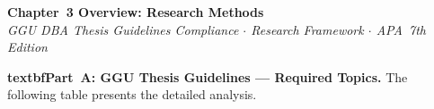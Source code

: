 
\thispagestyle{plain}

\begin{center}
{\large\bfseries\color{ggunavy} Chapter~3 Overview: Research Methods}\\[0.2cm]
{\small\textit{GGU DBA Thesis Guidelines Compliance $\cdot$ Research Framework $\cdot$ APA~7th Edition}}
\end{center}

\vspace{0.3cm}

\noindent\textbf{textbfPart~A: GGU Thesis Guidelines --- Required Topics.} The following table presents the detailed analysis.


